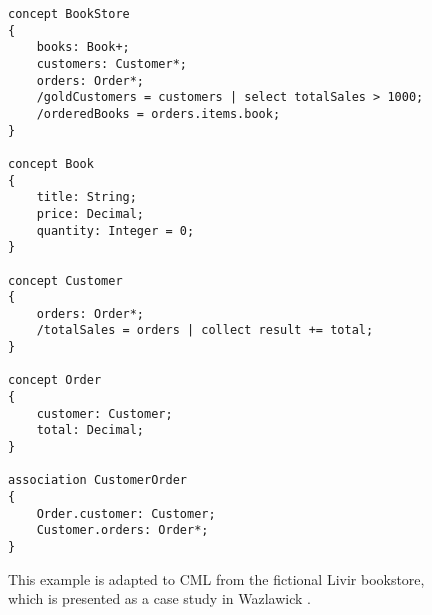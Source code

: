 \label{fig:store}
\begin{figure}
\begin{verbatim}
concept BookStore
{
    books: Book+;
    customers: Customer*;
    orders: Order*;
    /goldCustomers = customers | select totalSales > 1000;
    /orderedBooks = orders.items.book;
}

concept Book
{
    title: String;
    price: Decimal;
    quantity: Integer = 0;
}

concept Customer
{
    orders: Order*;
    /totalSales = orders | collect result += total;
}

concept Order
{
    customer: Customer;
    total: Decimal;
}

association CustomerOrder
{
    Order.customer: Customer;
    Customer.orders: Order*;
}
\end{verbatim}
\caption{This example is adapted to CML from the fictional Livir bookstore, which is presented as a case study in Wazlawick \cite{wazlawick}.}
\end{figure}
